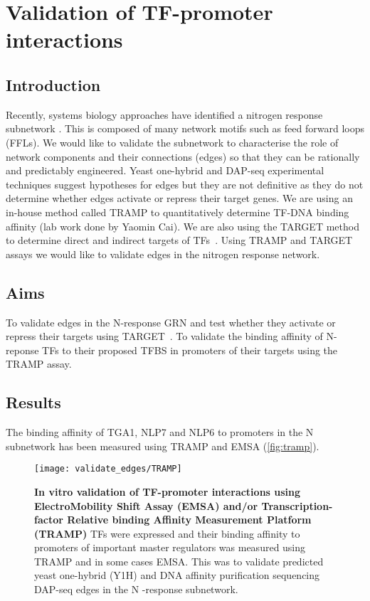 \documentclass[../main.tex]{subfiles}
\begin{document}
\chapter{Validation of TF-promoter interactions}\label{chapter4}
\section{Introduction}\label{chapter4:introduction}
Recently, systems biology approaches have identified a nitrogen response subnetwork \autocite{gaudinierTranscriptionalRegulationNitrogenassociated2018}.
This is composed of many network motifs such as feed forward loops (FFLs).
We would like to validate the subnetwork to characterise the role of network components and their connections (edges) so that they can be rationally and predictably engineered.
Yeast one-hybrid and DAP-seq experimental techniques suggest hypotheses for edges but they are not definitive as they do not determine whether edges activate or repress their target genes.
We are using an in-house method called TRAMP to quantitatively determine TF-DNA binding affinity (lab work done by Yaomin Cai).
We are also using the TARGET method to determine direct and indirect targets of TFs~\autocite{bargmannTARGETTransientTransformation2013}.
Using TRAMP and TARGET assays we would like to validate edges in the nitrogen response network.
\section{Aims}\label{chapter4:aims}
To validate edges in the N-response GRN and test whether they activate or repress their targets using TARGET~\autocite{bargmannTARGETTransientTransformation2013}.
To validate the binding affinity of N-reponse TFs to their proposed TFBS in promoters of their targets using the TRAMP assay.
\section{Results}\label{chapter4:results}
The binding affinity of TGA1, NLP7 and NLP6 to promoters in the N subnetwork has been measured using TRAMP and EMSA (\autoref{fig:tramp}).
\begin{figure}[hbt!]
	\begin{center}
		\capstart
		\texttt{[image: validate\_edges/TRAMP]}
		\caption{
			\textbf{In vitro validation of TF-promoter interactions using ElectroMobility Shift Assay (EMSA) and/or Transcription-factor Relative binding Affinity Measurement Platform (TRAMP)}
			TFs were expressed and their binding affinity to promoters of important master regulators was measured using TRAMP and in some cases EMSA.
            This was to validate predicted yeast one\hyp{}hybrid (Y1H) \autocite{gaudinierTranscriptionalRegulationNitrogenassociated2018} and DNA affinity purification sequencing {DAP-seq} \autocite{omalleyCistromeEpicistromeFeatures2016} edges in the N \hyp{}response subnetwork.
			\label{fig:tramp}
		}
	\end{center}
\end{figure}
\end{document}
